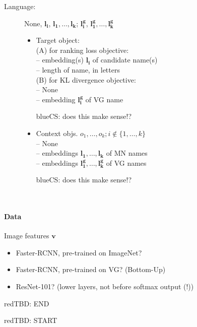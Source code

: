 \documentclass[11pt,a4paper]{article}
\renewcommand{\vec}[1]{\mathbf{#1}\xspace}
\newcommand{\cs}[1]{\begin{color}{blue}CS: #1\end{color}\xspace}
\newcommand{\tbd}[1]{\begin{color}{red}TBD: #1\end{color}\xspace}
\begin{document}
\begin{description}
	\item[Language:] None, $\vec{l_i}$, $\vec{l_1}, \dots, \vec{l_k}$; $\vec{l^g_i}$,  $\vec{l^g_1}, \dots, \vec{l^g_k}$
	\begin{itemize}
		\item Target object:\\
		(A) for ranking loss objective:\\
		-- embedding(s) $\vec{l_i}$ of candidate name(s)\\
		-- length of name, in letters\\
		(B) for KL divergence objective:\\
		-- None \\
		-- embedding $\vec{l^g_i}$ of VG name \cs{does this make sense!?}
		\item Context objs. \mbox{$o_1, \dots, o_k; i \notin \{1, \dots, k\}$}\\
		-- None \\
		-- embeddings $\vec{l_1}, \dots, \vec{l_k}$ of MN names\\
		-- embeddings $\vec{l^g_1}, \dots, \vec{l^g_k}$ of VG names \cs{does this make sense!?}\\
	\end{itemize}
\end{description}

\paragraph{Data}
Image features $\mathbf{v}$
\begin{itemize}
	\item Faster-RCNN, pre-trained on ImageNet?
	\item Faster-RCNN, pre-trained on VG? (Bottom-Up)
	\item ResNet-101? (lower layers, not before softmax output (!))
\end{itemize}
\tbd{END}

\noindent
\tbd{START}
\end{document}
